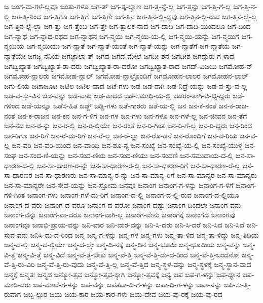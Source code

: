 {ಜ
ಜಂಗ-ಮ-ಗಳೆ-ಲ್ಲವೂ
ಜಂತು-ಗಳೂ
ಜಗ-ತ್
ಜಗ-ತ್ಕ-ಲ್ಯಾಣ
ಜಗ-ತ್ತ-ನ್ನೆ-ಲ್ಲ
ಜಗ-ತ್ತನ್ನು
ಜಗ-ತ್ತಿ-ಗೆ-ಲ್ಲ
ಜಗ-ತ್ತಿ-ನ-ಲ್ಲಿ
ಜಗ-ತ್ತಿ-ನಿಂದ
ಜಗ-ತ್ತಿಗೂ
ಜಗ-ತ್ತಿಗೆ
ಜಗ-ತ್ತಿಗೇ
ಜಗ-ತ್ತಿನ
ಜಗ-ತ್ತಿನ-ಲ್ಲಿ-ದ್ದವು
ಜಗ-ತ್ತಿನ-ಲ್ಲಿ-ರುವ
ಜಗ-ತ್ತಿನ-ಲ್ಲೆ-ಲ್ಲ
ಜಗ-ತ್ತಿನ-ಲ್ಲೆ-ಲ್ಲಾ
ಜಗ-ತ್ತು
ಜಗ-ತ್ತೆಂಬ
ಜಗ-ತ್ತೇ
ಜಗ-ತ್ಪಾಲಕ-ನಾದ
ಜಗ-ದಾದಿ
ಜಗ-ದಾದಿ-ಯಿಂದಲೂ
ಜಗ-ದಿಂದ
ಜಗ-ನ್ನಾಥ
ಜಗ-ನ್ನಾಥ-ರಥದ
ಜಗ-ನ್ನಾಥನ
ಜಗ-ನ್ಮಯಿ
ಜಗ-ನ್ಮಯಿ-ಯ-ಲ್ಲಿ
ಜಗ-ನ್ಮಯಿ-ಯನ್ನು
ಜಗ-ನ್ಮಯಿಗೆ
ಜಗ-ನ್ಮಯಿಯ
ಜಗ-ನ್ಮಯಿಯು
ಜಗ-ನ್ಮಾತೆ
ಜಗ-ನ್ಮಾತೆ-ಯಂತೆ
ಜಗ-ನ್ಮಾತೆ-ಯನ್ನು
ಜಗ-ನ್ಮಾತೆಗೆ
ಜಗ-ನ್ಮಾತೆಯ
ಜಗ-ನ್ಮಾತೆಯೇ
ಜಗಜ್ಜ-ನನಿಯ
ಜಗಜ್ಜಾಲಾ-ತ್
ಜಗದ
ಜಗದ-ಮೇಲೆ
ಜಗದೀ-ಶನ
ಜಗದೀಶ
ಜಗದ್ಗುರು-ಗ-ಳಾದ
ಜಗದ್ವಿಖ್ಯಾತ
ಜಗದ್ವಿಖ್ಯಾತ-ರಾ-ದರು
ಜಗದ್ವಿಖ್ಯಾತ-ರಾ-ದರೋ
ಜಗದ್ವಿಖ್ಯಾತ-ರಾದ
ಜಗದ್-ವಿಜಯಿ
ಜಗಮೋಹ-ನ್
ಜಗಮೋಹ-ನ್ಲಾಲರು
ಜಗಮೋಹ-ನ್ಲಾಲ್
ಜಗಮೋಹ-ನ್ಲಾಲ್ರೊಂದಿಗೆ
ಜಗಮೋಹನ-ಲಾಲರ
ಜಗಮೋಹನ-ಲಾಲ್
ಜಗು-ಲಿಯ
ಜಟಾಜೂಟ
ಜಟಿಲ
ಜಟಿಲ-ವಾದ
ಜಟೆ-ಗಳು
ಜಡ
ಜಡ-ನಾಗಿ
ಜಡ-ನಿದ್ರೆ-ಯನ್ನು
ಜಡ-ವ-ಸ್ತು-ವ-ಲ್ಲ
ಜಡ-ವ-ಸ್ತು-ವಿನ
ಜಡ-ವನ್ನು
ಜಡ-ವಾದ
ಜಡ-ವಾದದ
ಜಡ-ಸಮಾಧಿ-ಯ-ಲ್ಲಿ
ಜಡರಂ-ತಾಗಿ-ಬಿ-ಟ್ಟಿ-ದ್ದರು
ಜಡೆ-ಗಳಿಂದ
ಜಡೆ-ಯನ್ನೂ
ಜಡೆಸ-ಹಿತ
ಜಡ್ಜ್
ಜಡ್ಡಿ-ಗಳು
ಜತೆ-ಗಾರರು
ಜತೆ-ಯ-ಲ್ಲಿ
ಜನ
ಜನ-ಕ-ನಂತೆ
ಜನ-ಕ-ರಾಜ-ನಂತೆ
ಜನ-ಕ-ರಾಜನ
ಜನ-ಕನ
ಜನ-ಗ-ಳಿಗೆ
ಜನ-ಗಳ
ಜನ-ಗಳು
ಜನ-ಗಳೂ
ಜನ-ಗಳೆ-ಲ್ಲ
ಜನ-ಜೀವನ
ಜನ-ತೆಗೆ
ಜನ-ನದ
ಜನ-ರ-ನ್ನು
ಜನ-ರ-ಲ್ಲಿ
ಜನ-ರ-ಲ್ಲಿಯೇ
ಜನ-ರಂತೆ
ಜನ-ರಿ-ಗಿಂತ
ಜನ-ರಿ-ಗೆ-ಲ್ಲ
ಜನ-ರಿ-ದ್ದರು
ಜನ-ರಿಂದ
ಜನ-ರಿಗೂ
ಜನ-ರಿಗೆ
ಜನ-ರೆ-ದು-ರಿಗೆ
ಜನ-ರೆ-ಲ್ಲ
ಜನ-ರೆ-ಲ್ಲಾ
ಜನ-ರೊ-ಡನೆ
ಜನ-ರೊಂದಿಗೆ
ಜನ-ವ-ರಿಯ
ಜನ-ವ-ಲ್ಲ
ಜನ-ವರಿ
ಜನ-ವರಿ-ಯಿಂದ
ಜನ-ವಾರಿಧಿ
ಜನ-ಶೂ-ನ್ಯ
ಜನ-ಸಂಖ್ಯೆ
ಜನ-ಸಂಖ್ಯೆ-ಯ-ಲ್ಲಿ
ಜನ-ಸಂಖ್ಯೆ-ಯುಳ್ಳ
ಜನ-ಸಂಘ
ಜನ-ಸಂದ-ಣಿ-ಯನ್ನು
ಜನ-ಸಂದ-ಣಿಯ
ಜನ-ಸಂದ-ಣಿಯು
ಜನ-ಸಂದಣಿ
ಜನ-ಸಮುದಾಯ-ದ-ಲ್ಲಿ
ಜನ-ಸಾ-ಧಾರಣ-ದ-ಲ್ಲಿ
ಜನ-ಸಾ-ಧಾರಣ-ರ-ನ್ನು
ಜನ-ಸಾ-ಧಾರಣ-ರ-ಲ್ಲಿ
ಜನ-ಸಾ-ಧಾರಣ-ರಿಗೆ
ಜನ-ಸಾ-ಧಾರಣ-ರೆ-ಲ್ಲ
ಜನ-ಸಾ-ಧಾರಣರ
ಜನ-ಸಾ-ಧಾರಣರು
ಜನ-ಸಾ-ಮಾನ್ಯ-ರ-ನ್ನು
ಜನ-ಸಾ-ಮಾನ್ಯ-ರಿಗೆ
ಜನ-ಸಾ-ಮಾನ್ಯರ
ಜನ-ಸಾ-ಮಾನ್ಯರು
ಜನ-ಸಾ-ಮಾನ್ಯರೇ
ಜನ-ಸೇವೆ-ಯನ್ನು
ಜನ-ಸ್ತೋಮ
ಜನವೂ
ಜನಾಂಗ
ಜನಾಂಗ-ಗ-ಳನ್ನು
ಜನಾಂಗ-ಗ-ಳಿಗೆ
ಜನಾಂಗ-ಗಳಿ-ಗಿಂತ
ಜನಾಂಗ-ಗಳು
ಜನಾಂಗ-ಗಳೆ-ದು-ರಿಗೆ
ಜನಾಂಗ-ದ-ಲ್ಲಿ
ಜನಾಂಗ-ದ-ಲ್ಲಿ-ರುವ
ಜನಾಂಗ-ದ-ಲ್ಲಿಯೂ
ಜನಾಂಗ-ದ-ವರು
ಜನಾಂಗ-ದ-ವರೂ
ಜನಾಂಗ-ದ-ವರೋ
ಜನಾಂಗ-ದಷ್ಟು
ಜನಾಂಗ-ದಿಂದಲೇ
ಜನಾಂಗ-ವನು
ಜನಾಂಗ-ವನ್ನು
ಜನಾಂಗ-ವಾ-ದರೂ
ಜನಾಂಗ-ವಾಗಿ-ಲ್ಲ
ಜನಾಂಗ-ವೇನು
ಜನಾಂಗಕ್ಕೆ
ಜನಾಂಗದ
ಜನಾಂಗವು
ಜನಾಂಗವೂ
ಜನಾಭಿ-ಪ್ರಾಯ-ವನ್ನು
ಜನಿ-ವಾರ
ಜನಿ-ವಾರ-ವನ್ನು
ಜನಿ-ಸಿ-ದರು
ಜನಿ-ಸಿ-ದರೆ
ಜನಿ-ಸಿದ
ಜನಿ-ಸಿದೆ
ಜನಿ-ಸುವ-ವನು
ಜನಿಸಿ-ದು-ದ-ರಿಂದ
ಜನ್ಮ
ಜನ್ಮ-ಗ-ಳನ್ನು
ಜನ್ಮ-ಗಳ
ಜನ್ಮ-ಗಳು
ಜನ್ಮ-ತಾ-ಳಿದ
ಜನ್ಮ-ತಾ-ಳಿದ್ದು
ಜನ್ಮ-ತಿಥಿಯ
ಜನ್ಮ-ದ-ಲ್ಲಿ
ಜನ್ಮ-ದ-ಲ್ಲಿಯೇ
ಜನ್ಮ-ದ-ಲ್ಲೇ
ಜನ್ಮ-ದಿ-ನಕ್ಕೆ
ಜನ್ಮ-ದಿನ
ಜನ್ಮ-ಭೂಮಿ
ಜನ್ಮ-ಭೂಮಿಯ
ಜನ್ಮ-ವನ್ನು
ಜನ್ಮ-ವಿ-ತ್ತ
ಜನ್ಮ-ವಿ-ತ್ತೆ
ಜನ್ಮ-ವಿದೆ
ಜನ್ಮ-ವೆ-ತ್ತ-ಬೇಕು
ಜನ್ಮ-ವೆ-ತ್ತಿ
ಜನ್ಮ-ವೆ-ತ್ತಿ-ದು-ದ-ರಿಂದ
ಜನ್ಮ-ವೆ-ತ್ತಿ-ಬಂದನೋ
ಜನ್ಮ-ವೆ-ತ್ತಿ-ರು-ವಿರಿ
ಜನ್ಮ-ವೆ-ತ್ತಿ-ರು-ವುದು
ಜನ್ಮ-ವೆ-ತ್ತಿ-ಲ್ಲ
ಜನ್ಮ-ವೆ-ತ್ತಿದ
ಜನ್ಮ-ಸ್ಥಳ-ವನ್ನು
ಜನ್ಮ-ಸ್ಥಳಕ್ಕೆ
ಜನ್ಮ-ಸ್ಥಾನ-ವಾದ
ಜನ್ಮಕ್ಕೆ
ಜನ್ಮತಃ
ಜನ್ಮದ
ಜನ್ಮೋ-ತ್ಸವ
ಜನ್ಮೋ-ತ್ಸವ-ಕ್ಕಾಗಿ
ಜನ್ಮೋ-ತ್ಸವಕ್ಕೆ
ಜನ್ಯ
ಜಪ
ಜಪ-ಗ-ಳನ್ನು
ಜಪ-ಧ್ಯಾನ
ಜಪ-ಮಾಡಿ-ದರು
ಜಪ-ಮಾಲೆ-ಗ-ಳನ್ನು
ಜಪ-ವನ್ನು
ಜಪತಪಾ-ದಿ-ಗ-ಳನ್ನು
ಜಪಾ-ದಿ-ಗ-ಳನ್ನು
ಜಪಾ-ನನ್ನು
ಜಪಿ-ಸು-ತ್ತಿ-ರುವಾಗ
ಜಬ್ಬ-ಲ್ಪುರ
ಜಯ
ಜಯ-ಕಾರ
ಜಯ-ಕಾರ-ಗಳು
ಜಯ-ದೇವ
ಜಯ-ಪು-ರಕ್ಕೆ
ಜಯ-ಪು-ರದ
}
